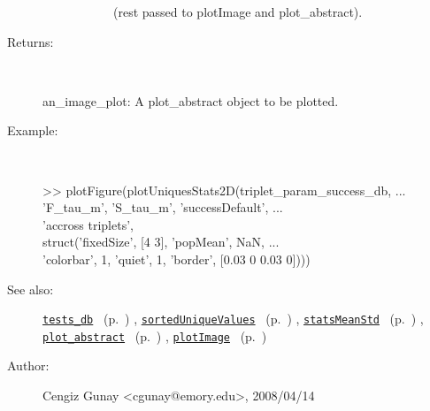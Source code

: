 \begin{description}
\begin{description}
\begin{description}
(rest passed to plotImage and plot\_abstract).
\end{description}%
\end{description}%
%
\item[Returns:
]~

	an\_image\_plot: A plot\_abstract object to be plotted.
%
\item[Example:]~
\begin{lyxcode} >> plotFigure(plotUniquesStats2D(triplet\_param\_success\_db, ...
\\%
               'F\_tau\_m', 'S\_tau\_m', 'successDefault', ...
\\%
                'accross triplets', 
\\%
                struct('fixedSize', [4 3], 'popMean', NaN, ...
\\%
                'colorbar', 1, 'quiet', 1, 'border', [0.03 0 0.03 0])))
\\%
\end{lyxcode}
%
\item[See also:]%
\hyperlink{ref_tests_db}{\texttt{tests\_db}}%
\ (p.~\pageref{ref_tests_db})%
%
, \hyperlink{ref_sortedUniqueValues}{\texttt{sortedUniqueValues}}%
\ (p.~\pageref{ref_sortedUniqueValues})%
%
, \hyperlink{ref_statsMeanStd}{\texttt{statsMeanStd}}%
\ (p.~\pageref{ref_statsMeanStd})%
%
, \hyperlink{ref_plot_abstract}{\texttt{plot\_abstract}}%
\ (p.~\pageref{ref_plot_abstract})%
%
, \hyperlink{ref_plotImage}{\texttt{plotImage}}%
\ (p.~\pageref{ref_plotImage})%
%
%
\item[Author:]%
Cengiz Gunay <cgunay@emory.edu>, 2008/04/14
%
\end{description}
\methodline%
